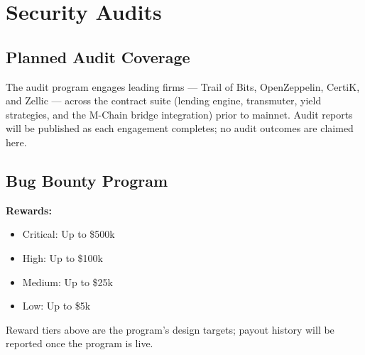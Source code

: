 \section{Security Audits}


\subsection{Planned Audit Coverage}

The audit program engages leading firms --- Trail of Bits, OpenZeppelin,
CertiK, and Zellic --- across the contract suite (lending engine, transmuter,
yield strategies, and the M-Chain bridge integration) prior to mainnet. Audit
reports will be published as each engagement completes; no audit outcomes are
claimed here.

\subsection{Bug Bounty Program}

\textbf{Rewards:}
\begin{itemize}
\item Critical: Up to \$500k
\item High: Up to \$100k
\item Medium: Up to \$25k
\item Low: Up to \$5k
\end{itemize}

Reward tiers above are the program's design targets; payout history will be reported once the program is live.

